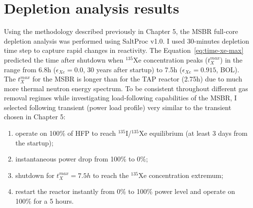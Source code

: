 \section{Depletion analysis results}
Using the methodology described previously in Chapter 5, the \gls{MSBR} 
full-core depletion analysis was performed using SaltProc v1.0. I 
used 30-minutes depletion time step to capture rapid changes in reactivity. 
The Equation~\ref{eq:time-xe-max} predicted the time after shutdown when 
$^{135}$Xe concentration peaks ($t^{max}_X$) in the range from 6.8h 
($\epsilon_{Xe}=0.0$, 30 years after startup) to 7.5h ($\epsilon_{Xe}=0.915$, 
\gls{BOL}). The $t^{max}_X$ for the \gls{MSBR} is longer than 
for the \gls{TAP} reactor (2.75h) due to much more thermal neutron energy 
spectrum.
To be consistent throughout different gas removal regimes while 
investigating load-following capabilities of the \gls{MSBR}, I selected 
following transient (power load profile) very similar to the transient chosen 
in Chapter 5:
\begin{enumerate}[label=(\alph*), noitemsep, topsep=0pt]
	\item operate on 100\% of \gls{HFP} to reach $^{135}$I/$^{135}$Xe 
	equilibrium (at 
	least 3 days from the startup);
	\item instantaneous power drop from 100\% to 0\%;
	\item shutdown for $t^{max}_X=7.5h$ to reach the $^{135}$Xe concentration 
	extremum;
	\item restart the reactor instantly from 0\% to 100\% power level and 
	operate on 100\% for a 5 hours.
\end{enumerate}


